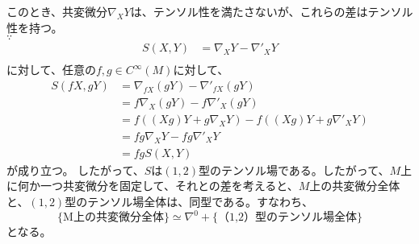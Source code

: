 \documentclass[a4paper,11pt]{jsarticle}
\numberwithin{equation}{section}
\begin{document}
このとき、共変微分$\nabla_XY$は、テンソル性を満たさないが、これらの差はテンソル性を持つ。\\
$\because$\\
\begin{align}
    S(X,Y) &= \nabla_XY - \nabla'_{X}Y\\
\end{align}
に対して、任意の$f,g \in C^\infty(M)$に対して、
\begin{align}
    S(fX,gY) &= \nabla_{fX}(gY) - \nabla'_{fX}(gY)\\
    &= f\nabla_X(gY) - f\nabla'_{X}(gY)\\
    &= f((Xg)Y + g\nabla_XY) - f((Xg)Y + g\nabla'_{X}Y)\\
    &= fg\nabla_XY - fg\nabla'_{X}Y\\
    &= fgS(X,Y)
\end{align}
が成り立つ。\hfill\qedsymbol
したがって、$S$は$(1,2)$型のテンソル場である。したがって、$M$上に何か一つ共変微分を固定して、それとの差を考えると、$M$上の共変微分全体と、$(1,2)$型のテンソル場全体は、同型である。すなわち、
\begin{equation}
 \{\text{M上の共変微分全体}\} \simeq \nabla^{0} +\{\text{（1,2）型のテンソル場全体}\}
\end{equation}
となる。\\
\end{document}
